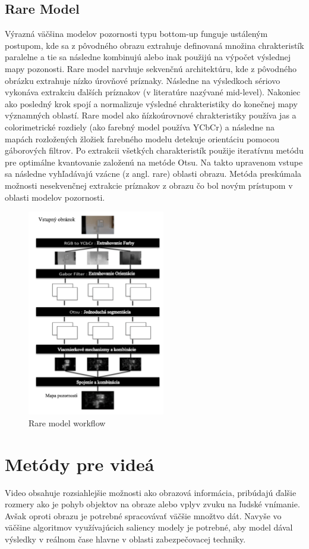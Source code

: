 \subsection{Rare Model}
Výrazná väčšina modelov pozornosti typu bottom-up funguje ustáleným postupom, kde sa z pôvodného obrazu extrahuje definovaná množina chrakteristík paralelne a tie sa následne kombinujú alebo inak použijú na výpočet výslednej mapy pozonosti.
Rare model narvhuje sekvenčnú architektúru, kde z pôvodného obrázku extrahuje nízko úrovňové príznaky.
Následne na výsledkoch sériovo vykonáva extrakciu ďalších príznakov (v literatúre nazývané mid-level).
Nakoniec ako posledný krok spojí a normalizuje výsledné chrakteristiky do konečnej mapy významných oblastí.
Rare model ako ňízkoúrovnové chrakteristiky používa jas a colorimetrické rozdiely (ako farebný model používa YCbCr) a následne na mapách rozložených žložiek farebného modelu detekuje orientáciu pomocou gáborových filtrov\cite{rare-1}.
Po extrakcii všetkých charakteristík použije iteratívnu metódu pre optimálne kvantovanie založenú na metóde Otsu\cite{otsu}.
Na takto upravenom vstupe sa následne vyhľadávajú vzácne (z angl. rare) oblasti obrazu.
Metóda preskúmala možnosti nesekvenčnej extrakcie príznakov z obrazu čo bol novým prístupom v oblasti modelov pozornosti.

\begin{figure}[H]
  \centering
  \includegraphics[width=6cm]{pics/rare-1-svk.png}
  \caption{Rare model workflow\cite{rare-1}}\label{wrap-fig:3}
\end{figure}

\section{Metódy pre videá}
Video obsahuje rozsiahlejšie možnosti ako obrazová informácia, pribúdajú ďalšie rozmery ako je pohyb objektov na obraze alebo vplyv zvuku na ľudské vnímanie.
Avšak oproti obrazu je potrebné spracovávať väčšie množtvo dát.
Navyše vo väčšine algoritmov využívajúcich saliency modely je potrebné, aby model dával výsledky v reálnom čase hlavne v oblasti zabezpečovacej techniky.
